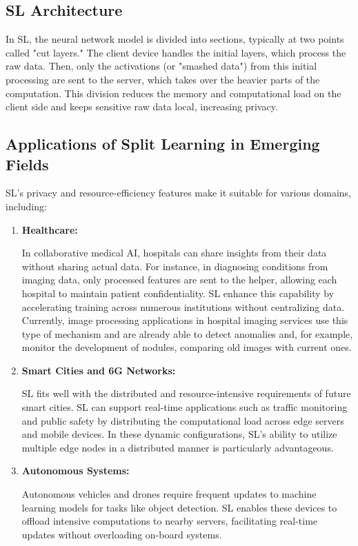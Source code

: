 \subsection{SL Architecture}
\label{sec:sl_architecture}

In \gls{SL}, the neural network model is divided into sections, typically at two points called "cut layers." The client device handles the initial layers, which process the raw data. Then, only the activations (or "smashed data") from this initial processing are sent to the server, which takes over the heavier parts of the computation. This division reduces the memory and computational load on the client side and keeps sensitive raw data local, increasing privacy.

\subsection{Applications of Split Learning in Emerging Fields}
\label{sec:application_of_sl_in_emerging_fields}


SL's privacy and resource-efficiency features make it suitable for various domains, including:

\begin{enumerate}
	\item \textbf{Healthcare:}
	
	In collaborative medical AI, hospitals can share insights from their data without sharing actual data. For instance, in diagnosing conditions from imaging data, only processed features are sent to the helper, allowing each hospital to maintain patient confidentiality. \gls{SL} enhance this capability by accelerating training across numerous institutions without centralizing data. Currently, image processing applications in hospital imaging services use this type of mechanism and are already able to detect anomalies and, for example, monitor the development of nodules, comparing old images with current ones. 
	\item \textbf{Smart Cities and 6G Networks:}
	
	SL fits well with the distributed and resource-intensive requirements of future smart cities. SL can support real-time applications such as traffic monitoring and public safety by distributing the computational load across edge servers and mobile devices. In these dynamic configurations, \gls{SL}’s ability to utilize multiple edge nodes in a distributed manner is particularly advantageous. 
	\item \textbf{Autonomous Systems:}
	 
	Autonomous vehicles and drones require frequent updates to machine learning models for tasks like object detection. \gls{SL} enables these devices to offload intensive computations to nearby servers, facilitating real-time updates without overloading on-board systems. ​

\end{enumerate}


